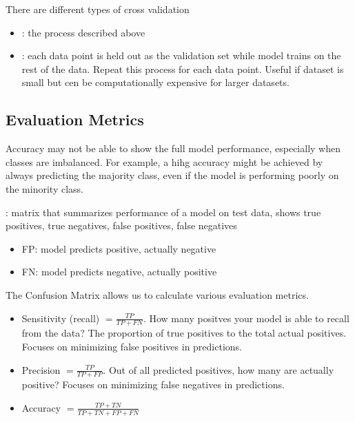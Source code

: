 \documentclass[12pt]{scrartcl}
\begin{document}
\begin{note}
  There are different types of cross validation
  \begin{itemize}
    \item {}: the process described above
    \item {}: each data point is held out as the validation set 
    while model trains on the rest of the data. Repeat this process for each data point. Useful if 
    dataset is small but cen be computationally expensive for larger datasets.
  \end{itemize}
\end{note}

\subsection{Evaluation Metrics}

\begin{note}
  Accuracy may not be able to show the full model performance, 
  especially when classes are imbalanced. For example, a hihg accuracy might be achieved 
  by always predicting the majority class, even if the model is performing poorly on the minority class.
\end{note}

\begin{definition}
  : matrix that summarizes performance of a model on test data, 
  shows true positives, true negatives, false positives, false negatives
  \begin{itemize}
    \item FP: model predicts positive, actually negative
    \item FN: model predicts negative, actually positive
  \end{itemize}
\end{definition}

\begin{definition}
  The Confusion Matrix allows us to calculate various evaluation metrics.
  \begin{itemize}
    \item Sensitivity (recall) $= \frac{TP}{TP + FN}$. How many positves your model is able to recall from the data? The proportion of true positives to the total actual positives.
    Focuses on minimizing false positives in predictions.
    \item Precision $= \frac{TP}{TP + FP}$. Out of all predicted positives, how many are actually positive? 
    Focuses on minimizing false negatives in predictions.
    \item Accuracy $= \frac{TP + TN}{TP + TN + FP + FN}$
  \end{itemize}
\end{definition}
\end{document}
